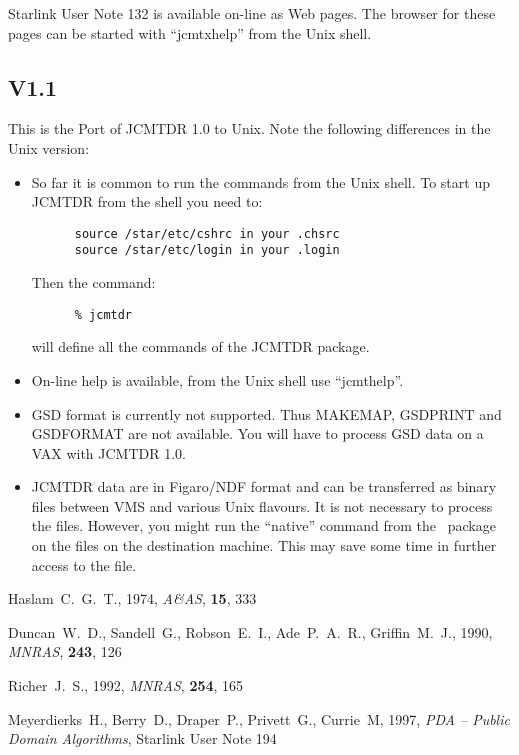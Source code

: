 \documentclass[twoside,11pt]{article}
\newcommand{\xref}[3]{#1}
\renewcommand{\_}{\texttt{\symbol{95}}}
\newcommand{\Kappa}{\xref{{\sc{Kappa}}}{sun95}{}}
\begin{document}
 Starlink User Note 132 is available on-line as Web pages. The browser
 for these pages can be started with ``jcmt\_xhelp'' from the Unix shell.


\subsection*{V1.1}

This is the Port of JCMTDR 1.0 to Unix. Note the following differences
in the Unix version:

\begin{itemize}
\item So far it is common to run the commands from the Unix shell. To start
   up JCMTDR from the shell you need to:

\begin{verbatim}
      source /star/etc/cshrc in your .chsrc
      source /star/etc/login in your .login
\end{verbatim}
   Then the command:
\begin{verbatim}
      % jcmtdr
\end{verbatim}
   will define all the commands of the JCMTDR package.

\item On-line help is available, from the Unix shell use ``jcmt\_help''.

\item GSD format is currently not supported. Thus MAKEMAP, GSD\_PRINT and
   GSD\_FORMAT are not available. You will have to process GSD data on a
   VAX with JCMTDR 1.0.

\item JCMTDR data are in Figaro/NDF format and can be transferred as binary
   files between VMS and various Unix flavours. It is not necessary to
   process the files. However, you might run the ``native'' command from
   the \Kappa\ package on the files on the destination machine. This may
   save some time in further access to the file.
\end{itemize}


\begin{thebibliography}{}

Haslam~C.~G.~T., 1974, \textit{A\&AS}, \textbf{15}, 333

Duncan~W.~D., Sandell~G., Robson~E.~I., Ade~P.~A.~R., Griffin~M.~J.,
1990, \textit{MNRAS}, \textbf{243}, 126

Richer~J.~S., 1992, \textit{MNRAS}, \textbf{254}, 165

Meyerdierks~H., Berry~D., Draper~P., Privett~G., Currie~M,
1997, \textit{ PDA -- Public Domain Algorithms},
\xref{Starlink User Note 194}{sun194}{}

\end{thebibliography}
\end{document}
